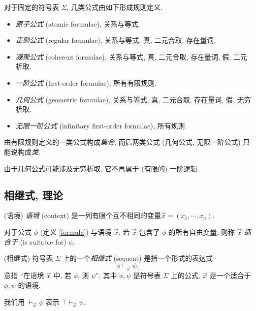 \begin{definition}
	[label={kinds-of-formulae}]
	{}
	对于固定的符号表 $\Sigma$,
	几类公式由如下形成规则定义.
	\begin{itemize}
		\item \emph{原子公式} (atomic formulae), 关系与等式.
		\item \emph{正则公式} (regular formulae), 关系与等式, 真, 二元合取, 存在量词.
		\item \emph{凝聚公式} (coherent formulae), 关系与等式, 真, 二元合取, 存在量词, 假, 二元析取.
		\item \emph{一阶公式} (first-order formulae), 所有有限规则.
		\item \emph{几何公式} (geometric formulae), 关系与等式, 真, 二元合取, 存在量词, 假, 无穷析取.
		\item \emph{无限一阶公式} (infinitary first-order formulae), 所有规则.
	\end{itemize}
\end{definition}



\begin{remark}
	{}
	由有限规则定义的一类公式构成\emph{集合}, 而后两类公式 (几何公式, 无限一阶公式) 只能说构成\emph{类}.
	
	由于几何公式可能涉及无穷析取, 它不再属于 (有限的) 一阶逻辑.
\end{remark}

\subsection{相继式, 理论}

\begin{definition}
	{(语境)}
	\emph{语境} (context) 是一列有限个互不相同的变量\footnotemark $\vec x = (x_1,\cdots,x_n)$.
	
	对于公式 $\phi$ (定义 \ref{formula}) 与语境 $\vec x$, 若 $\vec x$ 包含了 $\phi$ 的所有自由变量, 则称 $\vec x$ \emph{适合于} (is suitable for) $\phi$.
\end{definition}


\begin{definition}
	[label={sequents}]
	{(相继式)}
	符号表 $\Sigma$ 上的一个\emph{相继式} (sequent) 是指一个形式的表达式
	$$
	\phi \vdash_{\vec x} \psi,
	$$
	意指 ``在语境 $\vec x$ 中, 若 $\phi$, 则 $\psi$'', 其中 $\phi,\psi$ 是符号表 $\Sigma$ 上的公式,
	$\vec x$ 是一个适合于 $\phi,\psi$ 的语境.
	
	我们用 $\vdash_{\vec x} \psi$ 表示 $\top\vdash_{\vec x} \psi$.
\end{definition}


